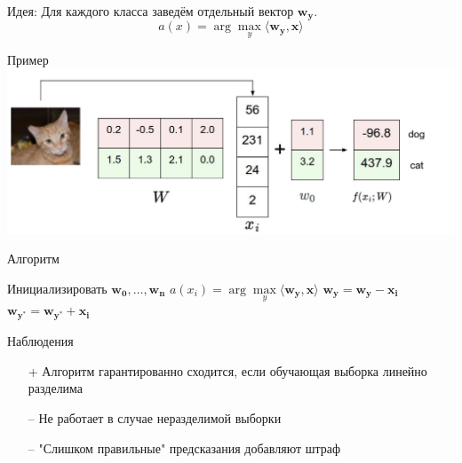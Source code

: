 \documentclass[10pt]{beamer}
\begin{document}
\begin{frame}
  \alert{Идея}: Для каждого класса заведём отдельный вектор $\mathbf{w_y}$.
  \bigbreak \pause
  $$a(x) = \arg\max\limits_{y} \langle \mathbf{w_y}, \mathbf{x} \rangle $$
\end{frame}

\begin{frame}{Пример}
  \centering
  \includegraphics[width=\textwidth, keepaspectratio]{images/catimagemap}
\end{frame}

\begin{frame}{Алгоритм}
	\begin{algorithmic}[1]
            \State Инициализировать ${\mathbf{w_0}, \dots, \mathbf{w_n}}$
                 \State $a(x_i) = \arg\max\limits_{y} \langle \mathbf{w_y}, \mathbf{x} \rangle $                 
                   \State $\mathbf{w_y} = \mathbf{w_y} - \mathbf{x_i}$
                   \State $\mathbf{w_{y^{*}}} = \mathbf{w_{y^{*}}} + \mathbf{x_i}$
                 \EndIf  
               \EndFor
           	\EndRepeat
        \EndFunction
    \end{algorithmic}
\end{frame}

\begin{frame} {Наблюдения}
    \begin{itemize} [<+->]
      \item[+] Алгоритм гарантированно сходится, если обучающая выборка линейно разделима
      \bigbreak
      \item[--] Не работает в случае неразделимой выборки 
      \item[--] "Слишком правильные" предсказания добавляют штраф      %
    \end{itemize}
\end{frame}
\end{document}

